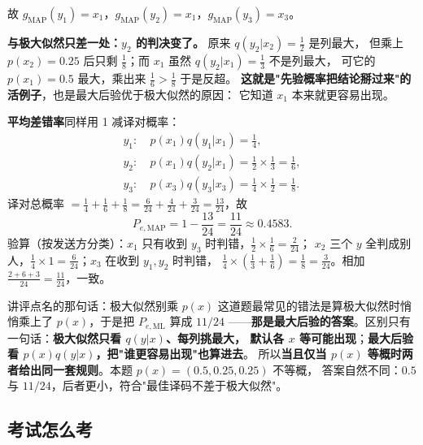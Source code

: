 故 $g_{\mathrm{MAP}}(y_1)=x_1$，$g_{\mathrm{MAP}}(y_2)=x_1$，$g_{\mathrm{MAP}}(y_3)=x_3$。

\textbf{与极大似然只差一处：$y_2$ 的判决变了。} 原来 $q(y_2|x_2)=\frac12$ 是列最大，
但乘上 $p(x_2)=0.25$ 后只剩 $\frac18$；而 $x_1$ 虽然 $q(y_2|x_1)=\frac13$ 不是列最大，
可它的 $p(x_1)=0.5$ 最大，乘出来 $\frac16>\frac18$ 于是反超。
\textbf{这就是"先验概率把结论掰过来"的活例子}，也是最大后验优于极大似然的原因：
它知道 $x_1$ 本来就更容易出现。

\textbf{平均差错率}同样用 1 减译对概率：
\begin{align*}
y_1:\ & p(x_1)q(y_1|x_1)=\tfrac14,\\
y_2:\ & p(x_1)q(y_2|x_1)=\tfrac12\times\tfrac13=\tfrac16,\\
y_3:\ & p(x_3)q(y_3|x_3)=\tfrac14\times\tfrac12=\tfrac18 .
\end{align*}
译对总概率 $=\frac14+\frac16+\frac18=\frac{6}{24}+\frac{4}{24}+\frac{3}{24}=\frac{13}{24}$，故
\[
P_{e,\mathrm{MAP}}=1-\frac{13}{24}=\boxed{\frac{11}{24}\approx0.4583}.
\]
验算（按发送方分类）：$x_1$ 只有收到 $y_3$ 时判错，$\frac12\times\frac16=\frac{2}{24}$；
$x_2$ 三个 $y$ 全判成别人，$\frac14\times1=\frac{6}{24}$；$x_3$ 在收到 $y_1,y_2$ 时判错，
$\frac14\times(\frac13+\frac16)=\frac18=\frac{3}{24}$。相加 $\frac{2+6+3}{24}=\frac{11}{24}$，一致。

\begin{exam}{讲评点名的那句话：极大似然别乘 $p(x)$}
这道题最常见的错法是算极大似然时悄悄乘上了 $p(x)$，于是把 $P_{e,\mathrm{ML}}$ 算成 $11/24$
——\textbf{那是最大后验的答案}。区别只有一句话：\textbf{极大似然只看 $q(y|x)$、每列挑最大，
默认各 $x$ 等可能出现}；\textbf{最大后验看 $p(x)q(y|x)$，把"谁更容易出现"也算进去}。
所以\textbf{当且仅当 $p(x)$ 等概时两者给出同一套规则}。本题 $p(x)=(0.5,0.25,0.25)$ 不等概，
答案自然不同：$0.5$ 与 $11/24$，后者更小，符合"最佳译码不差于极大似然"。
\end{exam}

\subsection{考试怎么考}


